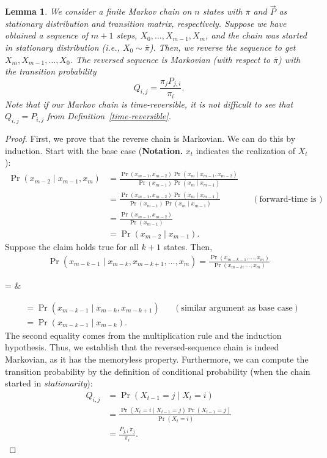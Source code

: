 \documentclass[12pt,a4paper]{article}
\newtheorem{lemma}[theorem]{Lemma}
\begin{document}
	\begin{lemma}
		We consider a finite Markov chain on \(n\) states with \(\overline{\pi}\) and \(\vec{P}\) as stationary distribution and transition matrix, respectively. Suppose we have obtained a sequence of \(m+1\) steps, \(X_0,\dots,X_{m-1},X_m\), and the chain was started in stationary distribution (i.e., \(X_0 \sim \overline{\pi}\)). Then, we reverse the sequence to get \(X_m, X_{m-1},\dots,X_0\). The reversed sequence is Markovian (with respect to \(\overline{\pi}\)) with the transition probability
		\[
		Q_{i,j} = \frac{\pi_j P_{j,i}}{\pi_i}.
		\]
		Note that if our Markov chain is time-reversible, it is not difficult to see that \(Q_{i,j} = P_{i,j}\) from Definition~\ref{time-reversible}.
		\label{lemma-1}
	\end{lemma}
	\begin{proof}
		First, we prove that the reverse chain is Markovian. We can do this by induction. Start with the base case (\textbf{Notation.} \(x_t\) indicates the realization of \(X_t\)):
		\begin{align*}
			\Pr(x_{m-2} \mid x_{m-1}, x_{m}) &= \frac{\Pr(x_{m-1}, x_{m-2})\Pr(x_m \mid x_{m-1}, x_{m-2})}{\Pr(x_{m-1}) \Pr(x_{m} \mid x_{m-1})}\\
			&= \frac{\Pr(x_{m-1}, x_{m-2})\Pr(x_m \mid x_{m-1})}{\Pr(x_{m-1}) \Pr(x_{m} \mid x_{m-1})} &&(\text{forward-time is Markovian})\\
			&= \frac{\Pr(x_{m-1}, x_{m-2})}{\Pr(x_{m-1})}\\
			&= \Pr(x_{m-2} \mid x_{m-1}).
		\end{align*}
		Suppose the claim holds true for all \(k+1\) states. Then,
		\begin{align*}
			\Pr(x_{m-k-1} \mid x_{m-k}, x_{m-k+1},\dots,x_m) = \frac{\Pr(x_{m-k-1},\dots, x_m)}{\Pr(x_{m-k},\dots, x_m)}
		\end{align*}
		\begin{flalign*}
			=  &
		\end{flalign*}
		\begin{align*}
			&= \Pr(x_{m-k-1} \mid x_{m-k},x_{m-k+1}) &&(\text{similar argument as base case})\\
			&= \Pr(x_{m-k-1} \mid x_{m-k}).
		\end{align*}
		The second equality comes from the multiplication rule and the induction hypothesis. Thus, we establish that the reversed-sequence chain is indeed Markovian, as it has the memoryless property. Furthermore, we can compute the transition probability by the definition of conditional probability (when the chain started in \emph{stationarity}):
		\begin{align*}
			Q_{i,j} &= \Pr(X_{t-1}=j\mid X_t=i)\\
			&= \frac{\Pr(X_t=i\mid X_{t-1}=j)\Pr(X_{t-1}=j)}{\Pr(X_t=i)}\\
			&= \frac{P_{j,i}\,\pi_j}{\pi_i}.
		\end{align*}
	\end{proof}
	
\end{document}
